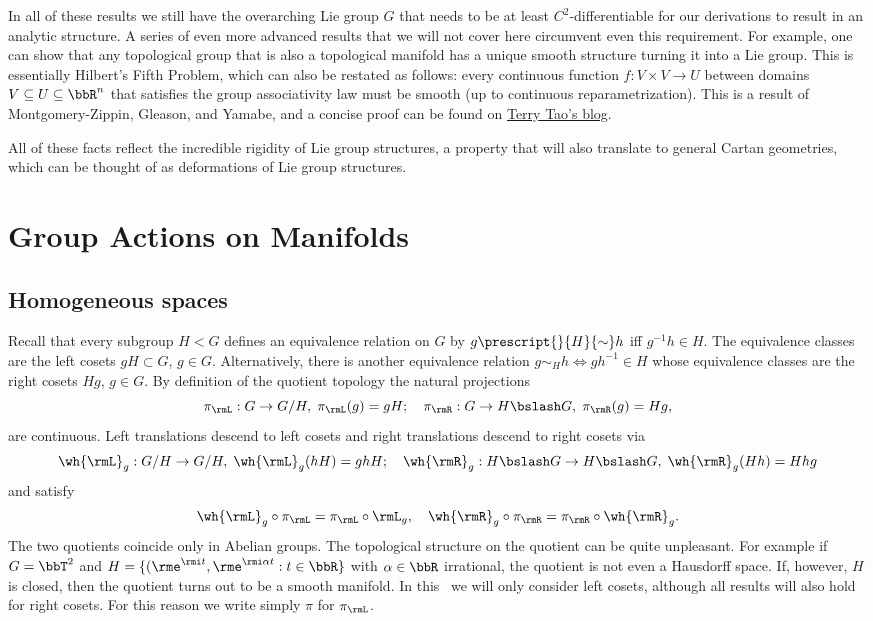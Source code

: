 \begin{rem}
    In all of these results we still have the overarching Lie group $G$ that needs to be at least $C^2$-differentiable for our derivations to result in an analytic structure. A series of even more advanced results that we will not cover here circumvent even this requirement. For example, one can show that any topological group that is also a topological manifold has a unique smooth structure turning it into a Lie group. This is essentially Hilbert's Fifth Problem, which can also be restated as follows: every continuous function $f:V\times V\to U$ between domains $V\subseteq U\subseteq \bbR^n$ that satisfies the group associativity law must be smooth (up to continuous reparametrization). This is a result of Montgomery-Zippin, Gleason, and Yamabe, and a concise proof can be found on \href{https://terrytao.wordpress.com/2011/06/17/hilberts-fifth-problem-and-gleason-metrics/}{Terry Tao's blog}.
\end{rem}

All of these facts reflect the incredible rigidity of Lie group structures, a property that will also translate to general Cartan geometries, which can be thought of as deformations of Lie group structures.








\clearpage
\chapter{Group Actions on Manifolds}


\section{Homogeneous spaces}\label{sec: homogeneous spaces}

Recall that every subgroup  $H<G$ defines an equivalence relation on $G$ by $g\prescript{}{H}{\sim}h$ iff $g^{-1}h\in H$. The equivalence classes are the left cosets $gH\subset G$, $g\in G$. Alternatively, there is another equivalence relation $g\sim_H h\Leftrightarrow gh^{-1}\in H$ whose equivalence classes are the right cosets $Hg$, $g\in G$.  By definition of the quotient topology the natural projections
\[\pi_\rmL:G\to G\slash H,\;\pi_\rmL(g)=gH;\quad \pi_\rmR:G\to H\bslash G,\;\pi_\rmR(g)=Hg,\]
are continuous. Left translations descend to left cosets and right translations descend to right cosets via
\[\wh{\rmL}_g:G\slash H\to G\slash H,\; \wh{\rmL}_g(hH)=ghH;\quad \wh{\rmR}_g: H\bslash G\to H\bslash G,\; \wh{\rmR}_g(Hh)=Hhg\]
and satisfy
\[\wh{\rmL}_g\circ \pi_\rmL=\pi_\rmL\circ \rmL_g,\quad \wh{\rmR}_g\circ \pi_\rmR=\pi_\rmR\circ \wh{\rmR}_g.\]
The two quotients coincide only in Abelian groups. The topological structure on the quotient can be quite unpleasant. For example if $G=\bbT^2$ and $H=\{(\rme^{\rmi t},\rme^{\rmi\alpha t}:t\in \bbR\}$ with $\alpha \in\bbR$ irrational, the quotient is not even a Hausdorff space. If, however, $H$ is closed, then the quotient turns out to be a smooth manifold. In this \sect\ we will only consider left cosets, although all results will also hold for right cosets. For this reason we write simply $\pi$ for $\pi_\rmL$.

